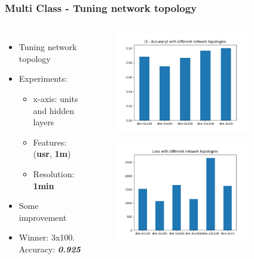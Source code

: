 \documentclass[aspectratio=169,11pt,hyperref={colorlinks=true}]{beamer}
\begin{document}
\begin{frame}
    \frametitle{Multi Class - Tuning network topology}
    \begin{columns}
        \begin{itemize}
            \item{Tuning network topology}
            \item{Experiments:}
            \begin{itemize}
              \item{x-axis: units and hidden layers}
              \item{Features: (\textbf{usr}, \textbf{1m})}
              \item{Resolution: \textbf{1min}}
            \end{itemize}
            \item{Some improvement}
            \item{Winner: 3x100. Accuracy: \emph{\textbf{0.925}}}
        \end{itemize}
        \begin{center}
        \begin{figure}
          \includegraphics[width=0.8\textwidth,height=0.4\textheight]{graphs/multiclass_accuracy_nw.jpeg}
        \end{figure}
        \begin{figure}
          \includegraphics[width=0.8\textwidth,height=0.4\textheight]{graphs/loss_by_topology-node_provider.png}
        \end{figure}
        \end{center}
  \end{columns}
\end{frame}
\end{document}
